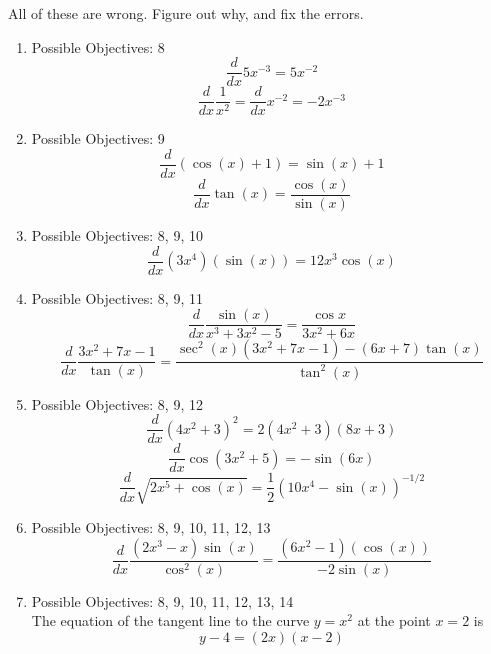 \documentclass{article}
\begin{document}
All of these are wrong. Figure out why, and fix the errors.
\begin{enumerate}
\item Possible Objectives: 8\\
$$\frac{d}{dx} 5x^{-3} = 5x^{-2}$$
$$\frac{d}{dx} \frac{1}{x^2} = \frac{d}{dx} x^{-2} = -2x^{-3}$$
\item Possible Objectives: 9\\
$$\frac{d}{dx} (\cos(x) + 1) = \sin(x) + 1$$
$$\frac{d}{dx} \tan(x) = \frac{\cos(x)}{\sin(x)}$$
\item Possible Objectives: 8, 9, 10\\
$$\frac{d}{dx} (3x^4)(\sin(x)) = 12x^3 \cos(x)$$
\item Possible Objectives: 8, 9, 11\\
$$\frac{d}{dx} \frac{\sin(x)}{x^3 + 3x^2 -5} = \frac{\cos{x}}{3x^2 + 6x}$$
$$\frac{d}{dx} \frac{3x^2 + 7x -1}{\tan(x)} = \frac{\sec^2(x)(3x^2 + 7x -1) - (6x + 7)\tan(x)}{\tan^2(x)}$$
\item Possible Objectives: 8, 9, 12\\ 
$$\frac{d}{dx} (4x^2 + 3)^2 = 2(4x^2 +3)(8x + 3)$$
$$\frac{d}{dx} \cos(3x^2 + 5) = -\sin(6x)$$
$$\frac{d}{dx} \sqrt{2x^5 + \cos(x)} = \frac{1}{2}(10x^4 - \sin(x))^{-1/2}$$
\item Possible Objectives: 8, 9, 10, 11, 12, 13\\
$$\frac{d}{dx} \frac{(2x^3 -x)\sin(x)}{\cos^2(x)} = \frac{(6x^2-1)(\cos(x))}{-2\sin(x)}$$
\item Possible Objectives: 8, 9, 10, 11, 12, 13, 14\\
The equation of the tangent line to the curve $y = x^2$ at the point $x = 2$ is $$y-4 = (2x)(x-2)$$
\end{enumerate}
\end{document}
